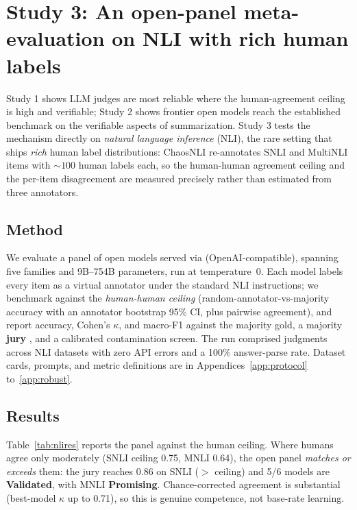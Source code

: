\section{Study 3: An open-panel meta-evaluation on NLI with rich human labels}\label{sec:study3}
Study 1 shows LLM judges are most reliable where the human-agreement ceiling is high and verifiable; Study 2 shows
frontier open models reach the established benchmark on the verifiable aspects of summarization. Study 3 tests the
mechanism directly on \emph{natural language inference} (NLI), the rare setting that ships \emph{rich} human label
distributions: ChaosNLI \citep{plank2022humanlabel} re-annotates SNLI and MultiNLI items with ${\sim}100$ human
labels each, so the human-human agreement ceiling and the per-item disagreement are measured precisely rather than
estimated from three annotators.

\subsection{Method}
We evaluate a panel of \STHRmodels{} open models served via \PROVIDER{} (OpenAI-compatible), spanning five families
and 9B--754B parameters, run at temperature~0. Each model labels every item as a virtual annotator under the
standard NLI instructions; we benchmark against the \emph{human-human ceiling} (random-annotator-vs-majority
accuracy with an annotator bootstrap 95\% CI, plus pairwise agreement), and report accuracy, Cohen's $\kappa$, and
macro-F1 against the majority gold, a majority \textbf{jury} \citep{verga2024poll}, and a calibrated
contamination screen. The run comprised \NLInjudg{} judgments across \NLIndat{} NLI datasets with zero API errors
and a 100\% answer-parse rate. Dataset cards, prompts, and metric definitions are in
Appendices~\ref{app:protocol} to~\ref{app:robust}.

\subsection{Results}
Table~\ref{tab:nlires} reports the panel against the human ceiling. Where humans agree only moderately
(SNLI ceiling 0.75, MNLI 0.64), the open panel \emph{matches or exceeds} them: the jury reaches 0.86 on SNLI
($>$ ceiling) and 5/6 models are \textbf{Validated}, with MNLI \textbf{Promising}. Chance-corrected agreement is
substantial (best-model $\kappa$ up to 0.71), so this is genuine competence, not base-rate learning.

